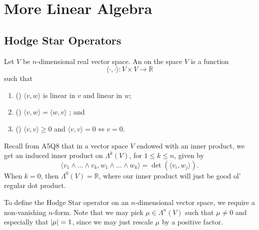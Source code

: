 \documentclass[notoc,notitlepage]{tufte-book}
\begin{document}
\section{More Linear Algebra}%
\label{sec:more_linear_algebra}

\subsection{Hodge Star Operators}%
\label{sub:hodge_star_operators}

\begin{defn}\label{defn:inner_product}
  Let $V$ be $n$-dimensional real vector space. An  on
  the space $V$ is a function
  \begin{equation*}
    \langle \cdot, \cdot \rangle : V \times V \to \mathbb{R}
  \end{equation*}
  such that
  \begin{enumerate}
    \item () $\langle v, w \rangle$ is linear in $v$ and linear in $w$;
    \item () $\langle v, w \rangle = \langle w, v \rangle$ ; and
    \item () $\langle v, v \rangle \geq 0$ and $\langle v, v
      \rangle = 0 \iff v = 0$.
  \end{enumerate}
\end{defn}

Recall from A5Q8 that in a vector space $V$ endowed with an inner product, we
get an induced inner product on $\Lambda^k(V)$, for $1 \leq k \leq n$, given by
\begin{equation*}
  \langle v_1 \land \hdots \land v_k, w_1 \land \hdots \land w_k \rangle = \det
  (\langle v_i, w_j \rangle).
\end{equation*}
When $k = 0$, then $\Lambda^0(V) = \mathbb{R}$, where our inner product will
just be good ol' regular dot product.

\begin{note}
  To define the Hodge Star operator on an $n$-dimensional vector space, we
  require a non-vanishing $n$-form. Note that we may pick $\mu \in \Lambda^n(V)$
  such that $\mu \neq 0$ and especially that $\left|\mu\right| = 1$, since we may just
  rescale $\mu$ by a positive factor.
\end{note}
\end{document}
